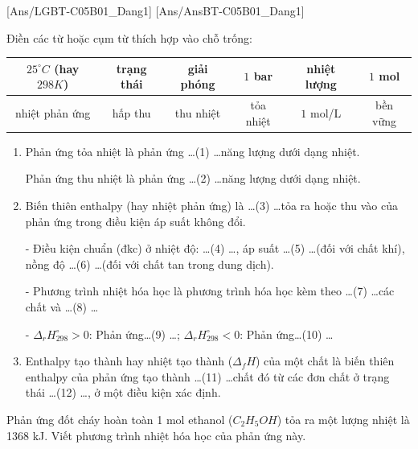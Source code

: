 \documentclass[Main.tex]{subfiles}
\begin{document}
	
	[Ans/LGBT-C05B01_Dang1]
	[Ans/AnsBT-C05B01_Dang1]
	\begin{bt}
		Điền các từ hoặc cụm từ thích hợp vào chỗ trống:
		\begin{center}
			\begin{tabular}{|c|c|c|c|c|c|}
				\hline
				$25^\circ C$ (hay $298K$) & trạng thái & giải phóng & $1$ bar & nhiệt lượng & $1$ mol \\
				\hline
				nhiệt phản ứng & hấp thu & thu nhiệt & tỏa nhiệt & $1$ mol/L & bền vững \\
				\hline
			\end{tabular}
		\end{center}
		\begin{enumerate}
			\item[(a)] Phản ứng tỏa nhiệt là phản ứng \ldots (1) \ldots năng lượng dưới dạng nhiệt.
			
			Phản ứng thu nhiệt là phản ứng \ldots (2) \ldots năng lượng dưới dạng nhiệt.
			\item[(b)] Biến thiên enthalpy (hay nhiệt phản ứng) là \ldots (3) \ldots tỏa ra hoặc thu vào của phản ứng trong điều kiện áp suất không đổi.
			
			- Điều kiện chuẩn (đkc) ở nhiệt độ: \ldots (4) \ldots, áp suất \ldots (5) \ldots (đối với chất khí), nồng độ \ldots (6) \ldots (đối với chất tan trong dung dịch).
			
			- Phương trình nhiệt hóa học là phương trình hóa học kèm theo \ldots (7) \ldots các chất và \ldots (8) \ldots
			
			- $\Delta_r H_{298}^\circ > 0$: Phản ứng\ldots (9) \ldots; $\Delta_r H_{298}^\circ < 0$: Phản ứng\ldots (10) \ldots
			\item[(c)] Enthalpy tạo thành hay nhiệt tạo thành ($\Delta_f H$) của một chất là biến thiên enthalpy của phản ứng tạo thành \ldots (11) \ldots chất đó từ các đơn chất ở trạng thái \ldots (12) \ldots, ở một điều kiện xác định.
		\end{enumerate}
	\end{bt}
	\begin{bt}
		Phản ứng đốt cháy hoàn toàn 1 mol ethanol ($C_2H_5OH$) tỏa ra một lượng nhiệt là 1368 kJ. Viết phương trình nhiệt hóa học của phản ứng này.
		\loigiai{
			$C_2H_5OH(l) + 3O_2(g) \longrightarrow 2CO_2(g) + 3H_2O(l)  \quad \Delta_rH = -1368 \text{ kJ}$
		}
	\end{bt}
\end{document}

